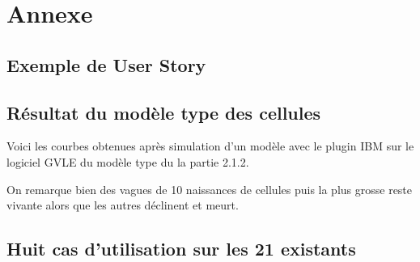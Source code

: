 \chapter{Annexe}
\setlength{\parskip}{2.5ex plus .4ex minus .4ex}
\section{Exemple de User Story}
\noindent\begin{minipage}{\linewidth}%
\end{minipage}

\section{Résultat du modèle type des cellules}
Voici les courbes obtenues après simulation d'un modèle avec le plugin IBM sur le logiciel GVLE du modèle type du la partie 2.1.2.

\begin{minipage}{\linewidth}%
\end{minipage}

On remarque bien des vagues de 10 naissances de cellules puis la plus grosse reste vivante alors que les autres déclinent et meurt.

\section{Huit cas d'utilisation sur les 21 existants}
